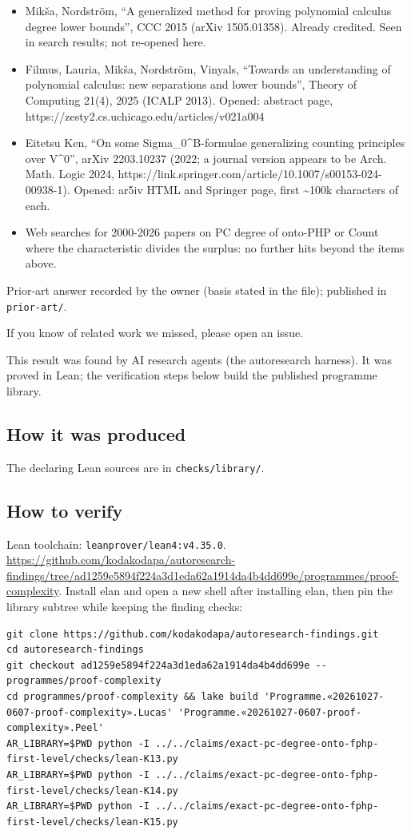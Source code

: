 \documentclass{article}
\begin{document}
\begin{itemize}
\item Mikša, Nordström, ``A generalized method for proving polynomial calculus degree lower bounds'', CCC 2015 (arXiv 1505.01358). Already credited. Seen in search results; not re-opened here.
\item Filmus, Lauria, Mikša, Nordström, Vinyals, ``Towards an understanding of polynomial calculus: new separations and lower bounds'', Theory of Computing 21(4), 2025 (ICALP 2013). Opened: abstract page, https://zesty2.cs.uchicago.edu/articles/v021a004
\item Eitetsu Ken, ``On some Sigma\_0\textasciicircum{}B-formulae generalizing counting principles over V\textasciicircum{}0'', arXiv 2203.10237 (2022; a journal version appears to be Arch. Math. Logic 2024, https://link.springer.com/article/10.1007/s00153-024-00938-1). Opened: ar5iv HTML and Springer page, first \textasciitilde{}100k characters of each.
\item Web searches for 2000-2026 papers on PC degree of onto-PHP or Count where the characteristic divides the surplus: no further hits beyond the items above.
\end{itemize}

Prior-art answer recorded by the owner (basis stated in the file); published in \texttt{prior-art/}.

If you know of related work we missed, please open an issue.

This result was found by AI research agents (the autoresearch harness). It was proved in Lean; the verification steps below build the published programme library.

\subsection*{How it was produced}

The declaring Lean sources are in \texttt{checks/library/}.

\subsection*{How to verify}

Lean toolchain: \texttt{leanprover/lean4:v4.35.0}. \url{https://github.com/kodakodapa/autoresearch-findings/tree/ad1259e5894f224a3d1eda62a1914da4b4dd699e/programmes/proof-complexity}. Install elan and open a new shell after installing elan, then pin the library subtree while keeping the finding checks:

\begin{verbatim}
git clone https://github.com/kodakodapa/autoresearch-findings.git
cd autoresearch-findings
git checkout ad1259e5894f224a3d1eda62a1914da4b4dd699e -- programmes/proof-complexity
cd programmes/proof-complexity && lake build 'Programme.«20261027-0607-proof-complexity».Lucas' 'Programme.«20261027-0607-proof-complexity».Peel'
AR_LIBRARY=$PWD python -I ../../claims/exact-pc-degree-onto-fphp-first-level/checks/lean-K13.py
AR_LIBRARY=$PWD python -I ../../claims/exact-pc-degree-onto-fphp-first-level/checks/lean-K14.py
AR_LIBRARY=$PWD python -I ../../claims/exact-pc-degree-onto-fphp-first-level/checks/lean-K15.py
\end{verbatim}
\end{document}
